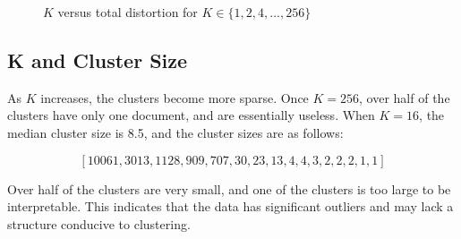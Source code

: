 \documentclass{article} %
\begin{document}
\clearpage

\begin{figure}[h]
\begin{center}
\end{center}
\caption{$K$ versus total distortion for $K \in \{1,2,4,...,256\}$}
\end{figure}

\subsection{K and Cluster Size}

As $K$ increases, the clusters become more sparse. Once $K=256$, over half of the clusters have only one document, and are essentially useless. When $K=16$, the median cluster size is 8.5, and the cluster sizes are as follows:

$$[10061, 3013, 1128, 909, 707, 30, 23, 13, 4, 4, 3, 2, 2, 2, 1, 1]$$

Over half of the clusters are very small, and one of the clusters is too large to be interpretable. This indicates that the data has significant outliers and may lack a structure conducive to clustering.
\end{document}
